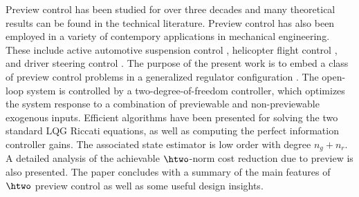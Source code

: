 \label{sec:Conclusions}
Preview control has been studied for over three decades and many theoretical results can be found in the technical literature. Preview control has also been employed in a variety of contempory applications in mechanical engineering. These include active automotive suspension control \cite{Roh_1999_Stoc_Opt_Prev,Marzbanrad_2004_SuspPrev}, helicopter flight control \cite{Paulino_2006_PreviewRotorcraftAffine}, 
and driver steering control \cite{Cole_2006_PredictiveAndPreviewSteeringControl}. The purpose of the present work is to embed a class of preview control problems in a generalized regulator configuration \cite{LimebeerGreen,ZDG}. The open-loop system is controlled by a two-degree-of-freedom controller, which optimizes the system response to a combination of previewable and non-previewable exogenous inputs. Efficient algorithms have been presented for solving the two standard LQG Riccati equations, as well as computing the perfect information controller gains. The associated state estimator is low order with degree $n_g+n_r$. A detailed analysis of the achievable $\htwo$-norm cost reduction due to preview is also presented. The paper concludes with a summary of the main features of $\htwo$ preview control as well as some useful design insights.



